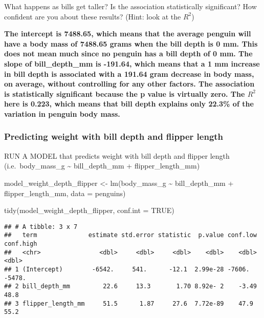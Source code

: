 \documentclass[
]{article}
\newenvironment{Shaded}{\begin{snugshade}}{\end{snugshade}}
\newcommand{\AttributeTok}[1]{\textcolor[rgb]{0.77,0.63,0.00}{#1}}
\newcommand{\ConstantTok}[1]{\textcolor[rgb]{0.00,0.00,0.00}{#1}}
\newcommand{\FunctionTok}[1]{\textcolor[rgb]{0.00,0.00,0.00}{#1}}
\newcommand{\NormalTok}[1]{#1}
\newcommand{\OtherTok}[1]{\textcolor[rgb]{0.56,0.35,0.01}{#1}}
\newcommand{\SpecialCharTok}[1]{\textcolor[rgb]{0.00,0.00,0.00}{#1}}
\begin{document}
What happens as bills get taller? Is the association statistically
significant? How confident are you about these results? (Hint: look at
the \(R^2\))

\textbf{The intercept is 7488.65, which means that the average penguin
will have a body mass of 7488.65 grams when the bill depth is 0 mm. This
does not mean much since no penguin has a bill depth of 0 mm. The slope
of bill\_depth\_mm is -191.64, which means that a 1 mm increase in bill
depth is associated with a 191.64 gram decrease in body mass, on
average, without controlling for any other factors. The association is
statistically significant because the p value is virtually zero. The
\(R^2\) here is 0.223, which means that bill depth explains only 22.3\%
of the variation in penguin body mass. }

\hypertarget{predicting-weight-with-bill-depth-and-flipper-length}{%
\subsubsection{Predicting weight with bill depth and flipper
length}\label{predicting-weight-with-bill-depth-and-flipper-length}}

RUN A MODEL that predicts weight with bill depth and flipper length
(i.e.~body\_mass\_g \textasciitilde{} bill\_depth\_mm +
flipper\_length\_mm)

\begin{Shaded}
\begin{Highlighting}[]
\NormalTok{model\_weight\_depth\_flipper }\OtherTok{\textless{}{-}} \FunctionTok{lm}\NormalTok{(body\_mass\_g }\SpecialCharTok{\textasciitilde{}} 
\NormalTok{                                   bill\_depth\_mm }\SpecialCharTok{+} 
\NormalTok{                                   flipper\_length\_mm,}
                         \AttributeTok{data =}\NormalTok{ penguins)}

\FunctionTok{tidy}\NormalTok{(model\_weight\_depth\_flipper, }\AttributeTok{conf.int =} \ConstantTok{TRUE}\NormalTok{)}
\end{Highlighting}
\end{Shaded}

\begin{verbatim}
## # A tibble: 3 x 7
##   term              estimate std.error statistic  p.value conf.low conf.high
##   <chr>                <dbl>     <dbl>     <dbl>    <dbl>    <dbl>     <dbl>
## 1 (Intercept)        -6542.     541.      -12.1  2.99e-28 -7606.     -5478. 
## 2 bill_depth_mm         22.6     13.3       1.70 8.92e- 2    -3.49      48.8
## 3 flipper_length_mm     51.5      1.87     27.6  7.72e-89    47.9       55.2
\end{verbatim}
\end{document}
